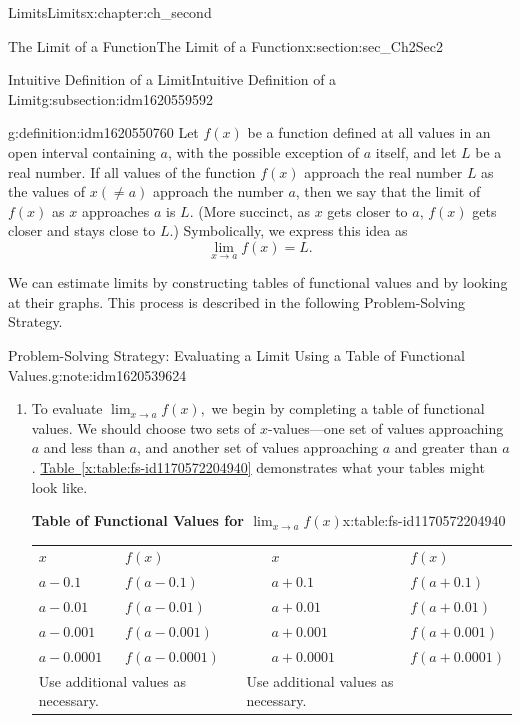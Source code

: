 \documentclass[oneside,10pt,]{book}
\newcommand{\tabularfont}{\relax}
\newcommand{\xreffont}{\relax}
\numberwithin{equation}{section}
\begin{document}
\begin{chapterptx}{Limits}{}{Limits}{}{}{x:chapter:ch_second}
\begin{sectionptx}{The Limit of a Function}{}{The Limit of a Function}{}{}{x:section:sec_Ch2Sec2}
\begin{subsectionptx}{Intuitive Definition of a Limit}{}{Intuitive Definition of a Limit}{}{}{g:subsection:idm1620559592}
\begin{definition}{}{g:definition:idm1620550760}
Let \(f(x)\) be a function defined at all values in an open interval containing \(a \), with the possible exception of \(a \) itself, and let \(L \) be a real number. If all values of the function \(f(x)\) approach the real number \(L \) as the values of \(x(\neq a)\) approach the number \(a \), then we say that the limit of \(f(x)\) as \(x\) approaches \(a \) is \(L \). (More succinct, as \(x\) gets closer to \(a \), \(f(x)\) gets closer and stays close to \(L \).) Symbolically, we express this idea as%
%
\begin{equation*}
\lim_{x \to a} f(x)=L.
\end{equation*}
\end{definition}
We can estimate limits by constructing tables of functional values and by looking at their graphs. This process is described in the following Problem-Solving Strategy.%
\begin{note}{Problem-Solving Strategy: Evaluating a Limit Using a Table of Functional Values.}{g:note:idm1620539624}%
%
\begin{enumerate}
\item{}To evaluate \(\lim_{x \to a} f(x),\) we begin by completing a table of functional values. We should choose two sets of \(x\)-values—one set of values approaching \(a \) and less than \(a \), and another set of values approaching \(a \) and greater than \(a \). \hyperref[x:table:fs-id1170572204940]{Table~{\xreffont\ref{x:table:fs-id1170572204940}}} demonstrates what your tables might look like. \begin{tableptx}{\textbf{Table of Functional Values for \(\lim_{x \to a} f(x)\)}}{x:table:fs-id1170572204940}{}%
\centering%
{\tabularfont%
\begin{tabular}{lllll}
\textbf{\(x\)}&\textbf{\(f(x)\)}&\textbf{}&\textbf{\(x\)}&\textbf{\(f(x)\)}\tabularnewline[0pt]
\(a-0.1\)&\(f(a-0.1)\)&&\(a+0.1\)&\(f(a+0.1)\)\tabularnewline[0pt]
\(a-0.01\)&\(f(a-0.01)\)&&\(a+0.01\)&\(f(a+0.01)\)\tabularnewline[0pt]
\(a-0.001\)&\(f(a-0.001)\)&&\(a+0.001\)&\(f(a+0.001)\)\tabularnewline[0pt]
\(a-0.0001\)&\(f(a-0.0001)\)&&\(a+0.0001\)&\(f(a+0.0001)\)\tabularnewline[0pt]
\multicolumn{2}{l}{Use additional values as necessary.}&\multicolumn{2}{l}{Use additional values as necessary.}
\end{tabular}
}%
\end{tableptx}%
%

\end{enumerate}
\end{note}
\end{subsectionptx}
\end{sectionptx}
\end{chapterptx}
\end{document}
